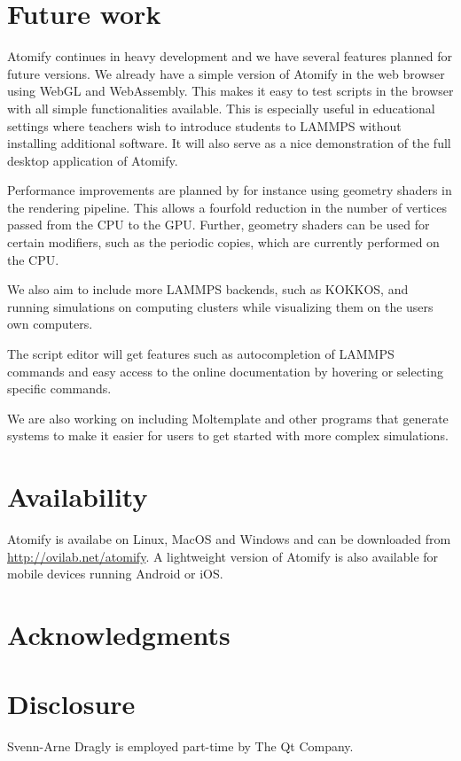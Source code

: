 \documentclass[aps,pre,twocolumn,letterpaper,floatfix,nofootinbib]{revtex4}
\begin{document}
\section{\label{sec:future}Future work}

Atomify continues in heavy development and we have several features planned for
future versions.
We already have a simple version of Atomify in the web browser using WebGL and WebAssembly.
This makes it easy to test scripts in the browser with all simple functionalities available.
This is especially useful in educational settings where teachers wish to introduce students
to LAMMPS without installing additional software.
It will also serve as a nice demonstration of the full desktop application of
Atomify.

Performance improvements are planned by for instance using geometry shaders in
the rendering pipeline.
This allows a fourfold reduction in the number of vertices passed from the CPU
to the GPU.
Further, geometry shaders can be used for certain modifiers,
such as the periodic copies, which are currently performed on the CPU.

We also aim to include more LAMMPS backends, such as KOKKOS, and running
simulations on computing clusters while visualizing them on the users own
computers.

The script editor will get features such as autocompletion of LAMMPS commands
and easy access to the online documentation by hovering or selecting specific
commands.

We are also working on including Moltemplate and other programs that generate
systems to make it easier for users to get started with more complex
simulations.

\section{Availability}

Atomify is availabe on Linux, MacOS and Windows and can be downloaded from
\href{https://ovilab.net/atomify}{http://ovilab.net/atomify}.
A lightweight version of Atomify is also available for mobile devices running
Android or iOS.

\section{Acknowledgments}

\section{Disclosure}

Svenn-Arne Dragly is employed part-time by The Qt Company.


\end{document}
